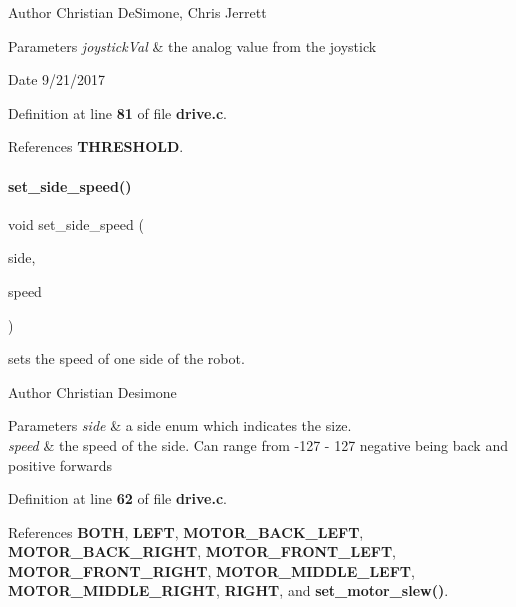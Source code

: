 \begin{DoxyAuthor}{Author}
Christian De\+Simone, Chris Jerrett 
\end{DoxyAuthor}

\begin{DoxyParams}{Parameters}
{\em joystick\+Val} & the analog value from the joystick \\
\hline
\end{DoxyParams}
\begin{DoxyDate}{Date}
9/21/2017 
\end{DoxyDate}


Definition at line \textbf{ 81} of file \textbf{ drive.\+c}.



References \textbf{ T\+H\+R\+E\+S\+H\+O\+LD}.

\mbox{\label{drive_8c_a8df41fd50094c065eedc81fc5e6595d1}} 
\paragraph{set\+\_\+side\+\_\+speed()}
{\footnotesize\ttfamily void set\+\_\+side\+\_\+speed (\begin{DoxyParamCaption}\item[{\textbf{ side\+\_\+t}}]{side,  }\item[{int}]{speed }\end{DoxyParamCaption})}



sets the speed of one side of the robot. 

\begin{DoxyAuthor}{Author}
Christian Desimone 
\end{DoxyAuthor}

\begin{DoxyParams}{Parameters}
{\em side} & a side enum which indicates the size. \\
\hline
{\em speed} & the speed of the side. Can range from -\/127 -\/ 127 negative being back and positive forwards \\
\hline
\end{DoxyParams}


Definition at line \textbf{ 62} of file \textbf{ drive.\+c}.



References \textbf{ B\+O\+TH}, \textbf{ L\+E\+FT}, \textbf{ M\+O\+T\+O\+R\+\_\+\+B\+A\+C\+K\+\_\+\+L\+E\+FT}, \textbf{ M\+O\+T\+O\+R\+\_\+\+B\+A\+C\+K\+\_\+\+R\+I\+G\+HT}, \textbf{ M\+O\+T\+O\+R\+\_\+\+F\+R\+O\+N\+T\+\_\+\+L\+E\+FT}, \textbf{ M\+O\+T\+O\+R\+\_\+\+F\+R\+O\+N\+T\+\_\+\+R\+I\+G\+HT}, \textbf{ M\+O\+T\+O\+R\+\_\+\+M\+I\+D\+D\+L\+E\+\_\+\+L\+E\+FT}, \textbf{ M\+O\+T\+O\+R\+\_\+\+M\+I\+D\+D\+L\+E\+\_\+\+R\+I\+G\+HT}, \textbf{ R\+I\+G\+HT}, and \textbf{ set\+\_\+motor\+\_\+slew()}.



